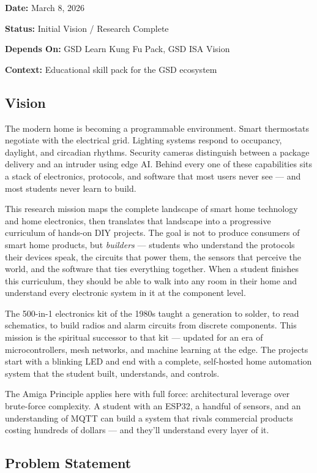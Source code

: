 \documentclass[11pt,letterpaper]{article}
\newcommand{\metafield}[2]{\textbf{\sffamily #1} #2\par}
\begin{document}
\metafield{Date:}{March 8, 2026}
\metafield{Status:}{Initial Vision / Research Complete}
\metafield{Depends On:}{GSD Learn Kung Fu Pack, GSD ISA Vision}
\metafield{Context:}{Educational skill pack for the GSD ecosystem}

\subsection{Vision}

The modern home is becoming a programmable environment. Smart thermostats negotiate with the electrical grid. Lighting systems respond to occupancy, daylight, and circadian rhythms. Security cameras distinguish between a package delivery and an intruder using edge AI. Behind every one of these capabilities sits a stack of electronics, protocols, and software that most users never see --- and most students never learn to build.

This research mission maps the complete landscape of smart home technology and home electronics, then translates that landscape into a progressive curriculum of hands-on DIY projects. The goal is not to produce consumers of smart home products, but \textit{builders} --- students who understand the protocols their devices speak, the circuits that power them, the sensors that perceive the world, and the software that ties everything together. When a student finishes this curriculum, they should be able to walk into any room in their home and understand every electronic system in it at the component level.

The 500-in-1 electronics kit of the 1980s taught a generation to solder, to read schematics, to build radios and alarm circuits from discrete components. This mission is the spiritual successor to that kit --- updated for an era of microcontrollers, mesh networks, and machine learning at the edge. The projects start with a blinking LED and end with a complete, self-hosted home automation system that the student built, understands, and controls.

The Amiga Principle applies here with full force: architectural leverage over brute-force complexity. A student with an ESP32, a handful of sensors, and an understanding of MQTT can build a system that rivals commercial products costing hundreds of dollars --- and they'll understand every layer of it.

\subsection{Problem Statement}
\end{document}
